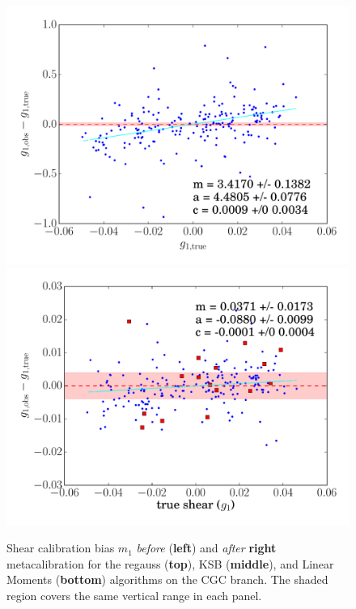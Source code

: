 \documentclass[iop]{emulateapj}
\begin{document}
\begin{figure}[t]
\begin{center}
\includegraphics[width=0.46\linewidth]{./Plots/m1-no_corrections-moments.pdf}
\includegraphics[width=0.46\linewidth]{./Plots/m1-moments-opt-shear_plots.pdf}
\end{center}
\caption{Shear calibration bias $m_1$ {\it before} ({\bf left}) and
  {\it after} {\bf right} metacalibration for the regauss ({\bf top}),
  KSB ({\bf middle}), and Linear Moments ({\bf bottom}) algorithms on
  the CGC branch. The shaded region covers the same vertical range in
  each panel.}
\label{fig:m_comparison}
\end{figure}
\end{document}
